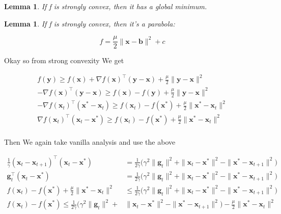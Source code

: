 \documentclass{article}
\newtheorem{lemma}[theorem]{Lemma}
\begin{document}
	\begin{lemma}
		If f is strongly convex, then it has a global minimum.
	\end{lemma} 
	
	\begin{lemma}
		If f is strongly convex, then it's a parabola:
		
		\[ f = \frac{\mu}{2} \|\mathbf{x-b}\|^2 + c \]
	\end{lemma}
	
	Okay so from strong convexity We get 
	
	\begin{align*}
		f(\mathbf{y}) \ge f(\mathbf{x}) + \nabla f(\mathbf{x})^\top(\mathbf{y-x}) + \frac{\mu}{2} \|\mathbf{y-x}\|^2\\
		 - \nabla f(\mathbf{x})^\top(\mathbf{y-x})  \ge  f(\mathbf{x}) - f(\mathbf{y})  + \frac{\mu}{2} \|\mathbf{y-x}\|^2\\
		 - \nabla f(\mathbf{x}_t)^\top(\mathbf{x^*-x}_t)  \ge  f(\mathbf{x}_t) - f(\mathbf{x}^*)  + \frac{\mu}{2} \|\mathbf{x}^*-\mathbf{x}_t\|^2\\
		 \nabla f(\mathbf{x}_t)^\top(\mathbf{x}_t - \mathbf{x}^*)  \ge  f(\mathbf{x}_t) - f(\mathbf{x}^*)  + \frac{\mu}{2} \|\mathbf{x}^*-\mathbf{x}_t\|^2\\
	\end{align*}	
	
	Then We again take vanilla analysis and use the above
	
	\begin{align*}
		\frac{1}{\gamma}(\mathbf{x}_t - \mathbf{x}_{t+1})^\top (\mathbf{x}_t - \mathbf{x}^*) &= \frac{1}{2\gamma}\big( \gamma^2\|\mathbf{g}_t\|^2 + \|\mathbf{x}_t - \mathbf{x}^*\|^2 - \| \mathbf{x}^* - \mathbf{x}_{t+1} \|^2 \big) \\
		\mathbf{g}_t^\top (\mathbf{x}_t - \mathbf{x}^*) &= \frac{1}{2\gamma}\big( \gamma^2\|\mathbf{g}_t\|^2 + \|\mathbf{x}_t - \mathbf{x}^*\|^2 - \| \mathbf{x}^* - \mathbf{x}_{t+1} \|^2 \big) \\
		 f(\mathbf{x}_t) - f(\mathbf{x}^*)  + \frac{\mu}{2} \|\mathbf{x}^*-\mathbf{x}_t\|^2 &\le \frac{1}{2\gamma}\big( \gamma^2\|\mathbf{g}_t\|^2 + \|\mathbf{x}_t - \mathbf{x}^*\|^2 - \| \mathbf{x}^* - \mathbf{x}_{t+1} \|^2 \big) \\
		 f(\mathbf{x}_t) - f(\mathbf{x}^*)   \le \frac{1}{2\gamma}\big( \gamma^2\|\mathbf{g}_t\|^2 + &\|\mathbf{x}_t - \mathbf{x}^*\|^2 - \| \mathbf{x}^* - \mathbf{x}_{t+1} \|^2 \big) - \frac{\mu}{2} \|\mathbf{x}^*-\mathbf{x}_t\|^2 
	\end{align*}
	
\end{document}
